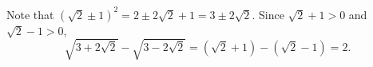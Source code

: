 Note that $\left(\sqrt2\pm1\right)^2=2\pm2\sqrt2+1=3\pm2\sqrt2$. Since $\sqrt2+1>0$ and $\sqrt2-1>0$,
\[\sqrt{3+2\sqrt2}-\sqrt{3-2\sqrt2}=\left(\sqrt2+1\right)-\left(\sqrt2-1\right)=\boxed{2}.\]
